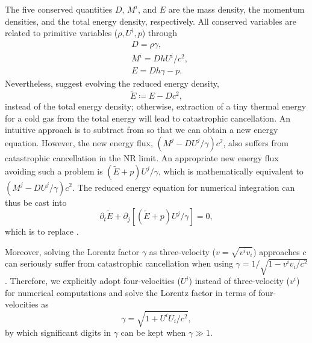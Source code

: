 The five conserved quantities $D$, $M^{i}$, and $E$ are the mass density, the momentum densities, and the total energy density, respectively. All conserved variables are related to primitive variables ($\rho, U^{i}, p$) through
\begin{subequations}
  \begin{align}
    &D=\rho\gamma,\label{density}\\
    &M^{i}=Dh U^{i} /c^2,\label{momentum}\\
    &E=D h\gamma-p. \label{definition of reduced energy}
  \end{align}
  \label{relation between prim and cons}
\end{subequations}
Nevertheless, \cite{NR_Limit} suggest evolving the reduced energy density,
\begin{equation}
\tilde{E} \coloneqq E-Dc^2, \label{ETilde}
\end{equation}
instead of the total energy density; otherwise, extraction of a tiny thermal energy for a cold gas from the total energy will lead to catastrophic cancellation. An intuitive approach is to subtract  from  so that we can obtain a new energy equation. However, the new energy flux, $\left(M^{j}-DU^{j}/\gamma\right)c^2$, also suffers from catastrophic cancellation in the NR limit. An appropriate new energy flux avoiding such a problem is $(\tilde{E}+p)U^{j}/\gamma$, which is mathematically equivalent to $\left(M^{j}-DU^{j}/\gamma\right)c^2$. The reduced energy equation for numerical integration can thus be cast into
\begin{equation}
    \partial_t \tilde{E}+\partial_j \left[\left(\tilde{E}+p\right)U^{j}/\gamma\right]=0,
    \label{ETilde evolution}
\end{equation}
which is to replace .


Moreover, solving the Lorentz factor $\gamma$ as three-velocity ($v=\sqrt{v^{i}v_{i}}$) approaches $c$ can seriously suffer from catastrophic cancellation when using $\gamma=1/\sqrt{1-v^{i}v_{i}/c^2}$. Therefore, we explicitly adopt four-velocities ($U^{i}$) instead of three-velocity ($v^{i}$) for numerical computations and solve the Lorentz factor in terms of four-velocities as
\begin{equation}
\label{eq:new expression of Lorentz factor}
\gamma=\sqrt{1+U^iU_i/c^2},
\end{equation}
by which significant digits in $\gamma$ can be kept when $\gamma \gg 1$.

